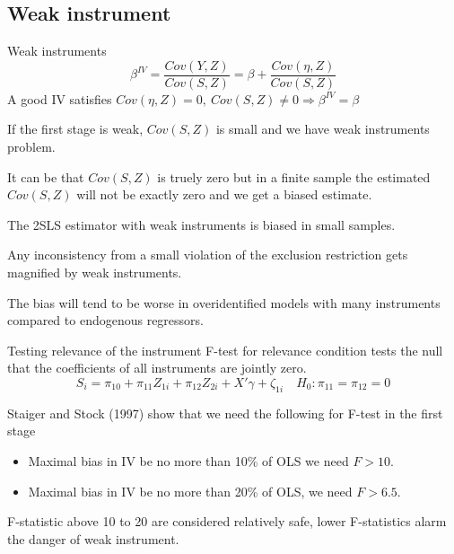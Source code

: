 \documentclass{beamer}
\begin{document}
%
%

\subsection{Weak instrument}

\begin{frame}{Weak instruments}
\[\beta^{IV}=\frac{Cov(Y,Z)}{Cov(S,Z)}=\beta+\frac{Cov(\eta,Z)}{Cov(S,Z)} \]
A good IV satisfies $Cov(\eta,Z)=0, \ Cov(S,Z)\neq 0 \Rightarrow \beta^{IV}=\beta$\medskip

If the first stage is weak, $Cov(S,Z)$ is small and we have weak instruments problem.\medskip

It can be that $Cov(S,Z)$ is truely zero but in a finite sample the estimated $Cov(S,Z)$  will not be exactly zero and we get a biased estimate. \medskip

The 2SLS estimator with weak instruments is biased in small samples.\medskip

Any inconsistency from a small violation of the exclusion restriction gets magnified by weak instruments.\medskip


The bias will tend to be worse in overidentified models with many instruments compared to endogenous regressors.
\end{frame}

\begin{frame}{Testing relevance of the instrument}
F-test for relevance condition tests the null that the coefficients of all instruments are jointly zero. 
\[S_i = \pi_{10} + \pi_{11}Z_{1i} + \pi_{12}Z_{2i} + X'\gamma + \zeta_{1i}\quad H_0: \pi_{11}=\pi_{12}=0 \]


Staiger and Stock (1997) show that we need the following for F-test in the first stage 

\begin{itemize}
\item Maximal bias in IV be no more than 10\% of OLS we need $F>10$.
\item Maximal bias in IV be no more than 20\% of OLS, we need $F>6.5$.
\end{itemize}

F-statistic above 10 to 20 are considered relatively safe, lower
F-statistics alarm the danger of weak instrument.
\end{frame}
\end{document}
